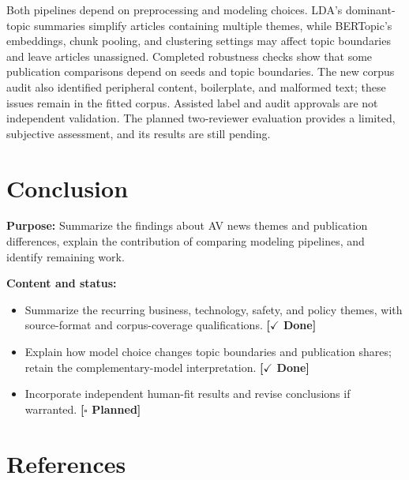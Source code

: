 \documentclass[conference]{IEEEtran}
\newcommand{\done}{\textcolor{green!40!black}{\textbf{[$\checkmark$ Done]}}}
\newcommand{\planned}{\textcolor{blue!60!black}{\textbf{[$\square$ Planned]}}}
\begin{document}
Both pipelines depend on preprocessing and modeling choices. LDA's dominant-topic summaries simplify articles containing multiple themes, while BERTopic's embeddings, chunk pooling, and clustering settings may affect topic boundaries and leave articles unassigned. Completed robustness checks show that some publication comparisons depend on seeds and topic boundaries. The new corpus audit also identified peripheral content, boilerplate, and malformed text; these issues remain in the fitted corpus. Assisted label and audit approvals are not independent validation. The planned two-reviewer evaluation provides a limited, subjective assessment, and its results are still pending.

\section*{Conclusion}
\textbf{Purpose:} Summarize the findings about AV news themes and publication differences, explain the contribution of comparing modeling pipelines, and identify remaining work.

\textbf{Content and status:}
\begin{itemize}
    \item Summarize the recurring business, technology, safety, and policy themes, with source-format and corpus-coverage qualifications. \done
    \item Explain how model choice changes topic boundaries and publication shares; retain the complementary-model interpretation. \done
    \item Incorporate independent human-fit results and revise conclusions if warranted. \planned
\end{itemize}

\newpage
\section*{References}
\printbibliography[heading=none]
\end{document}
